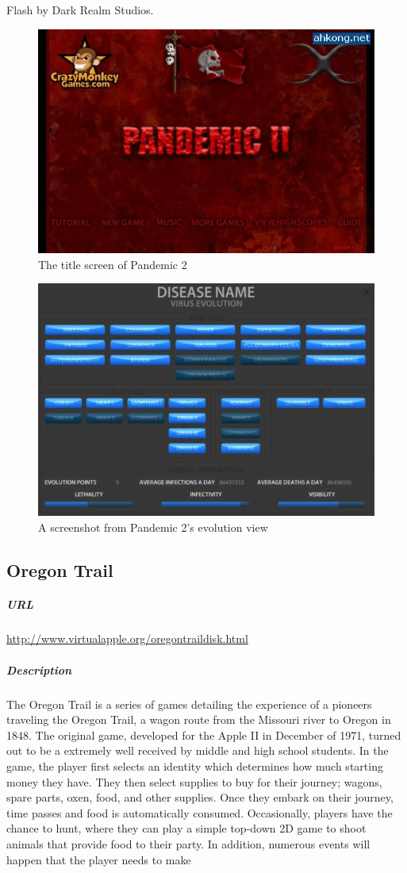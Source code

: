 Flash by Dark Realm Studios.\newpage\begin{figure}[h!]\centering \includegraphics[height=0.33\textheight]{img/pandemic_title.jpg}\caption{The title screen of Pandemic 2}\end{figure}\begin{figure}[h!]\centering \includegraphics[height=0.33\textheight]{img/pandemic_screen.jpg}\caption{A screenshot from Pandemic 2's evolution view}\end{figure}\subsection{Oregon Trail}\subparagraph{URL}\url{http://www.virtualapple.org/oregontraildisk.html}\subparagraph{Description}The Oregon Trail is a series of games detailing the experience of a pioneers traveling the Oregon Trail, a wagon route from the Missouri river to Oregon in 1848. The original game, developed for the Apple II in December of 1971, turned out to be a extremely well received by middle and high school students. In the game, the player first selects an identity which determines how much starting money they have. They then select supplies to buy for their journey; wagons, spare parts, oxen, food, and other supplies. Once they embark on their journey, time passes and food is automatically consumed. Occasionally, players have the chance to hunt, where they can play a simple top-down 2D game to shoot animals that provide food to their party. In addition, numerous events will happen that the player needs to make 